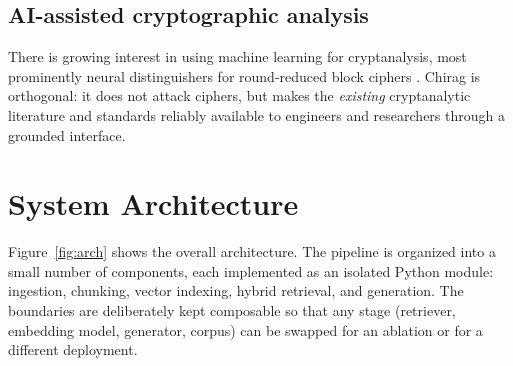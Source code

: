 \documentclass[version=submission]{iacrcc}
\begin{document}
\subsection{AI-assisted cryptographic analysis}
There is growing interest in using machine learning for cryptanalysis, most
prominently neural distinguishers for round-reduced block ciphers
\cite{gohr2019}. Chirag is orthogonal: it does not attack ciphers, but
makes the \emph{existing} cryptanalytic literature and standards reliably
available to engineers and researchers through a grounded interface.

\section{System Architecture}
\label{sec:arch}

Figure~\ref{fig:arch} shows the overall architecture. The pipeline is
organized into a small number of components, each implemented as an isolated
Python module: ingestion, chunking, vector indexing, hybrid retrieval, and
generation. The boundaries are deliberately kept composable so that any stage
(retriever, embedding model, generator, corpus) can be swapped for an
ablation or for a different deployment.
\end{document}
